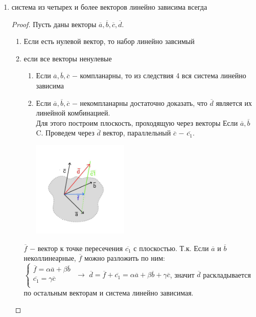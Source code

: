 \begin{corollary}
\begin{enumerate}
		\item система из четырех и более векторов линейно зависима всегда
		\begin{proof} Пусть даны векторы $\overline{a}, \overline{b}, \overline{c}, \overline{d}$.
			\begin{enumerate}
				\item Если есть нулевой вектор, то набор линейно завсимый
				\item если все векторы ненулевые
				\begin{enumerate}
					\item Если $\overline{a}, \overline{b}, \overline{c}$ $-$ компланарны, то из следствия 4 вся система линейно зависима
					\item Если $\overline{a}, \overline{b}, \overline{c}$ $-$ некомпланарны достаточно доказать, что $\overline{d}$ является их линейной комбинацией.\\
					Для этого построим плоскость, проходящую через векторы Если $\overline{a}, \overline{b}$C. Проведем через $\overline{d}$ вектор, параллельный $\overline{c}$ $-$ $\overline{c_1}$.
					\begin{center}
						\includegraphics[width=0.4\textwidth]{images/5.jpeg}
					\end{center}
				\end{enumerate}
				$\overline{f}$ $-$ вектор к точке пересечения $\overline{c_1}$ с плоскостью. Т.к. Если $\overline{a}$ и $\overline{b}$ неколлинеарные, $\overline{f}$ можно разложить по ним:\\
				$\begin{cases}
					\overline{f} = \alpha\overline{a}+\beta\overline{b}\\
					\overline{c_1}=\gamma\overline{c}\\
				\end{cases}$ $\longrightarrow$ $\overline{d}=\overline{f}+\overline{c_1}= \alpha\overline{a}+\beta\overline{b}+\gamma\overline{c}$, значит $\overline{d}$ раскладывается по остальным векторам и система линейно зависимая.
			\end{enumerate}
		\end{proof}
		
	\end{enumerate}
\end{corollary}
